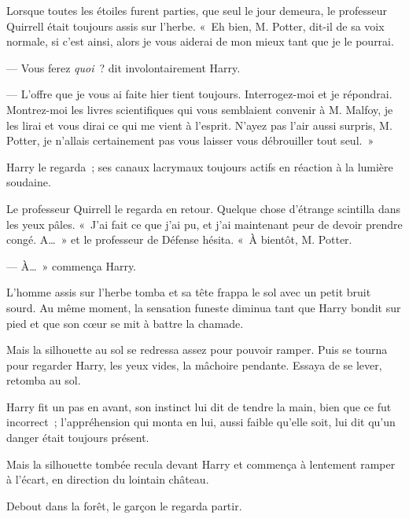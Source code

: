 Lorsque toutes les étoiles furent parties, que seul le jour demeura, le professeur Quirrell était toujours assis sur l'herbe. «~Eh bien, M. Potter, dit-il de sa voix normale, si c'est ainsi, alors je vous aiderai de mon mieux tant que je le pourrai.

--- Vous ferez \emph{quoi}~? dit involontairement Harry.

--- L'offre que je vous ai faite hier tient toujours. Interrogez-moi et je répondrai. Montrez-moi les livres scientifiques qui vous semblaient convenir à M. Malfoy, je les lirai et vous dirai ce qui me vient à l'esprit. N'ayez pas l'air aussi surpris, M. Potter, je n'allais certainement pas vous laisser vous débrouiller tout seul.~»

Harry le regarda~; ses canaux lacrymaux toujours actifs en réaction à la lumière soudaine.

Le professeur Quirrell le regarda en retour. Quelque chose d'étrange scintilla dans les yeux pâles. «~J'ai fait ce que j'ai pu, et j'ai maintenant peur de devoir prendre congé. A…~» et le professeur de Défense hésita. «~À bientôt, M. Potter.

--- À…~» commença Harry.

L'homme assis sur l'herbe tomba et sa tête frappa le sol avec un petit bruit sourd. Au même moment, la sensation funeste diminua tant que Harry bondit sur pied et que son cœur se mit à battre la chamade.

Mais la silhouette au sol se redressa assez pour pouvoir ramper. Puis se tourna pour regarder Harry, les yeux vides, la mâchoire pendante. Essaya de se lever, retomba au sol.

Harry fit un pas en avant, son instinct lui dit de tendre la main, bien que ce fut incorrect~; l'appréhension qui monta en lui, aussi faible qu'elle soit, lui dit qu'un danger était toujours présent.

Mais la silhouette tombée recula devant Harry et commença à lentement ramper à l'écart, en direction du lointain château.

Debout dans la forêt, le garçon le regarda partir.
